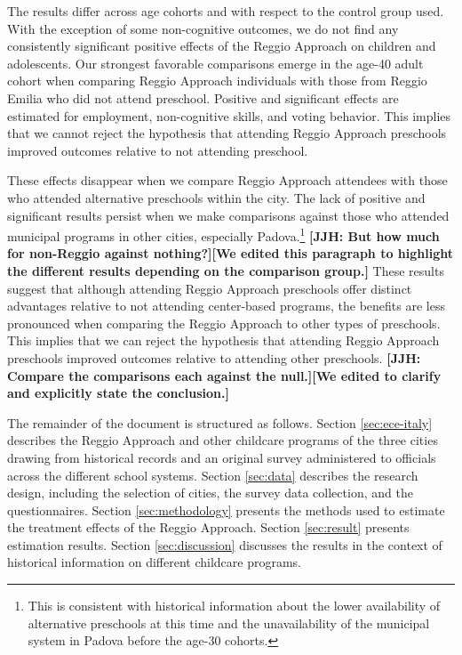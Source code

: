 The results differ across age cohorts and with respect to the control group used. With the exception of some non-cognitive outcomes, we do not find any consistently significant positive effects of the Reggio Approach on children and adolescents. Our strongest favorable comparisons emerge in the age-40 adult cohort when comparing Reggio Approach individuals with those from Reggio Emilia who did not attend preschool. Positive and significant effects are estimated for employment, non-cognitive skills, and voting behavior. This implies that we cannot reject the hypothesis that attending Reggio Approach preschools improved outcomes relative to not attending preschool.

These effects disappear when we compare Reggio Approach attendees with those who attended alternative preschools within the city. The lack of positive and significant results persist when we make comparisons against those who attended municipal programs in other cities, especially Padova.\footnote{This is consistent with historical information about the lower availability of alternative preschools at this time and the unavailability of the municipal system in Padova before the age-30 cohorts.} \textbf{[JJH: But how much for non-Reggio against nothing?][We edited this paragraph to highlight the different results depending on the comparison group.]} These results suggest that although attending Reggio Approach preschools offer distinct advantages relative to not attending center-based programs, the benefits are less pronounced when comparing the Reggio Approach to other types of preschools. This implies that we can reject the hypothesis that attending Reggio Approach preschools improved outcomes relative to attending other preschools. \textbf{[JJH: Compare the comparisons each against the null.][We edited to clarify and explicitly state the conclusion.]}

The remainder of the document is structured as follows. Section \ref{sec:ece-italy} describes the Reggio Approach and other childcare programs of the three cities drawing from historical records and an original survey administered to officials across the different school systems. Section \ref{sec:data} describes the research design, including the selection of cities, the survey data collection, and the questionnaires. Section \ref{sec:methodology} presents the methods used to estimate the treatment effects of the Reggio Approach. Section \ref{sec:result} presents estimation results. Section \ref{sec:discussion} discusses the results in the context of historical information on different childcare programs.

